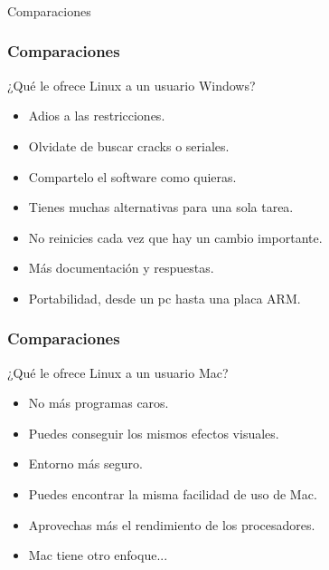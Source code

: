\frame
{
\frametitle{}
\begin{center}
	\Huge{Comparaciones}
\end{center}
}

\frame
{
\frametitle{Comparaciones}
\Large{¿Qué le ofrece Linux a un usuario  Windows?}
\normalsize
\begin{itemize}
	\item Adios a las restricciones.
	\item Olvidate de buscar cracks o seriales.
	\item Compartelo el software como quieras.
	\item Tienes muchas alternativas para una sola tarea.
	\item No reinicies cada vez que hay un cambio importante.
	\item Más documentación y respuestas.
	\item Portabilidad, desde un pc hasta una placa ARM.
\end{itemize}
}

\frame
{
\frametitle{Comparaciones}
\Large{¿Qué le ofrece Linux a un usuario Mac?}
\normalsize
\begin{itemize}
	\item No más programas caros.
	\item Puedes conseguir los mismos efectos visuales.
	\item Entorno más seguro.
	\item Puedes encontrar la misma facilidad de uso de Mac.
	\item Aprovechas más el rendimiento de los procesadores.
	\item Mac tiene otro enfoque...
\end{itemize}
}
